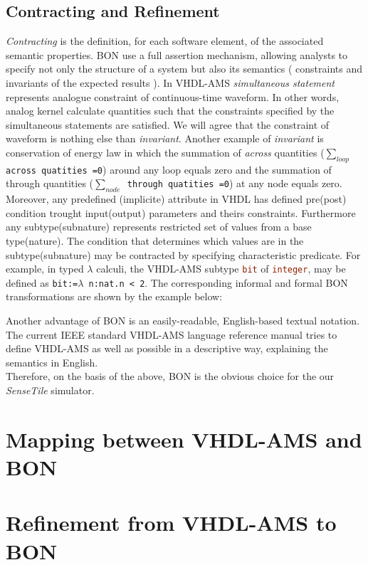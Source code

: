 \documentclass{article}
\def\lstinlinenc{\lstinline[language=VHDL,basicstyle=\normalsize\bfseries]}
\newcommand{\ST}{\emph{SenseTile}\xspace}
\newcommand{\arcoss}{\emph{across}\xspace}
\begin{document}
\subsection{Contracting and Refinement}
\emph{Contracting} is the definition, for each software element, 
of the associated semantic properties. BON use a full assertion mechanism, 
allowing analysts to specify not only the structure of a system but also its
semantics ( constraints and invariants of the expected results ). 
In VHDL-AMS \emph{simultaneous statement} represents analogue constraint of 
continuous-time waveform. In other words, analog kernel calculate quantities such 
that the constraints specified by the simultaneous statements are satisfied. 
We will agree that the constraint of waveform is nothing else than \emph{invariant}.
Another example of \emph{invariant} is conservation of energy law in which 
the summation of \arcoss quantities (\texttt{$\sum_{loop}$ across quatities =0}) 
around any loop equals zero and the summation of through 
quantities (\texttt{$\sum_{node}$ through quatities =0}) at any node equals zero. 
Moreover, any predefined (implicite) attribute in VHDL 
has defined pre(post) condition trought input(output) 
parameters and theirs constraints. Furthermore any subtype(subnature) 
represents restricted set of values from a base type(nature). 
The condition that determines which values are in the subtype(subnature)  
may be contracted by specifying characteristic predicate. 
For example, in typed $\lambda$ calculi, the VHDL-AMS subtype \lstinlinenc|bit| of 
\lstinlinenc|integer|, may be defined as \texttt{bit:=$\lambda$ n:nat.n < 2}. 
The corresponding informal and formal BON transformations are shown 
by the example below:

Another advantage of BON is an easily-readable, English-based textual notation. 
The current IEEE standard VHDL-AMS language reference manual tries to define 
VHDL-AMS as well as possible in a descriptive way, explaining the 
semantics in English.\\
Therefore, on the basis of the above, BON is the obvious choice 
for the our \ST simulator.
\section{Mapping between VHDL-AMS and BON}


\section{Refinement from VHDL-AMS to BON }
 
\end{document}
